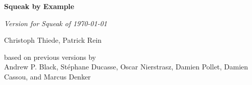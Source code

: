 \begin{titlepage}
   \begin{center}
		\vspace*{1cm}

		\huge\textbf{Squeak by Example}

		\vspace{0.5cm}
		       
		\normalsize\emph{Version{\ifdefined\SQUEAKVERSION
			\space{}for Squeak \SQUEAKVERSION%
			\else\fi\space{}of \today}}%
            
      	\vspace{0.5cm}

		\large Christoph Thiede, Patrick Rein

		\vspace{0.5cm}
            
		based on previous versions by \\
		Andrew P. Black, St\'ephane Ducasse, Oscar Nierstrasz, Damien Pollet, Damien Cassou, and Marcus Denker
            
   \end{center}
\end{titlepage}

